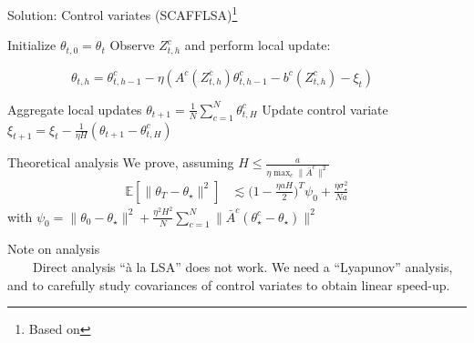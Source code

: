\documentclass[aspectratio=169,14pt]{beamer}
\begin{document}
\begin{frame}{Solution: Control variates (SCAFFLSA)\footnote{Based on }}

  \vspace{0.5em}

  \small

  \begin{algorithmic}
    \State Initialize $\theta_{t,0} = \theta_t$
    \State Observe $Z^c_{t,h}$ and perform local update:
    \begin{center}
      ~~~~~~~~~~$\theta_{t,h} = \theta_{t,h-1}^c - \eta( A^c(Z^c_{t,h}) \theta_{t,h-1}^c - b^c(Z^c_{t,h}) - \xi_t)$
    \end{center}
  \vspace{-0.2em}
    \EndFor
  \vspace{-0.2em}
    \EndFor
    \State Aggregate local updates $\theta_{t+1} = \tfrac{1}{N} \sum\nolimits_{c=1}^{N} \theta_{t,H}^c $
    \State Update control variate $\xi_{t+1} = \xi_t - \frac{1}{\eta H} ( \theta_{t+1} - \theta_{t,H}^c )$
    \EndFor
  \end{algorithmic}
  \vspace{1.5em}
\end{frame}


\begin{frame}{Theoretical analysis}
  We prove, assuming $H \le \frac{a}{\eta \max_c \| \bar{A}^c \|^2}$
  \begin{align*}
    \mathbb{E}[\| \theta_{T} - \theta_\star \|^2]
    & \lesssim{}
      \big( 
      1 - \tfrac{\eta a H}{2}
      \big)^T \psi_0
      +
      \frac{\eta \sigma_\star^2}{N a}
  \end{align*}
  with $\psi_0 = \| \theta_0 - \theta_\star \|^2 + \frac{\eta^2H^2}{N} \sum_{c=1}^N \| \bar{A}^c( \theta_\star^c - \theta_\star) \|^2$


  \vspace{1em}

  \pause
  
  \small

  Note on analysis\\  
  ~~~~Direct analysis ``à la LSA'' does not work. We need a ``Lyapunov'' analysis, and to carefully study covariances of control variates to obtain linear speed-up.
\end{frame}
\end{document}
